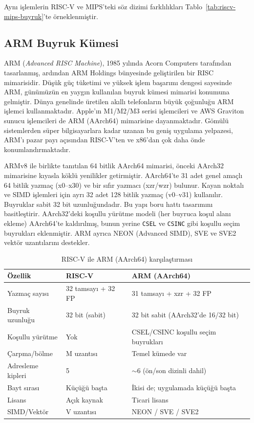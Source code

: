 Aynı işlemlerin RISC-V ve MIPS'teki söz dizimi farklılıkları Tablo~\ref{tab:riscv-mips-buyruk}'te örneklenmiştir.

\subsection{ARM Buyruk Kümesi}

ARM (\textit{Advanced RISC Machine}), 1985 yılında Acorn Computers tarafından tasarlanmış, ardından ARM Holdings bünyesinde geliştirilen bir RISC mimarisidir. Düşük güç tüketimi ve yüksek işlem başarımı dengesi sayesinde ARM, günümüzün en yaygın kullanılan buyruk kümesi mimarisi konumuna gelmiştir. Dünya genelinde üretilen akıllı telefonların büyük çoğunluğu ARM işlemci kullanmaktadır. Apple'ın M1/M2/M3 serisi işlemcileri ve AWS Graviton sunucu işlemcileri de ARM (AArch64) mimarisine dayanmaktadır. Gömülü sistemlerden süper bilgisayarlara kadar uzanan bu geniş uygulama yelpazesi, ARM'ı pazar payı açısından RISC-V'ten ve x86'dan çok daha önde konumlandırmaktadır.

ARMv8 ile birlikte tanıtılan 64 bitlik AArch64 mimarisi, önceki AArch32 mimarisine kıyasla köklü yenilikler getirmiştir. AArch64'te 31 adet genel amaçlı 64 bitlik yazmaç (x0--x30) ve bir sıfır yazmacı (xzr/wzr) bulunur. Kayan noktalı ve SIMD işlemleri için ayrı 32 adet 128 bitlik yazmaç (v0--v31) kullanılır. Buyruklar sabit 32 bit uzunluğundadır. Bu yapı boru hattı tasarımını basitleştirir. AArch32'deki koşullu yürütme modeli (her buyruca koşul alanı ekleme) AArch64'te kaldırılmış, bunun yerine \texttt{CSEL} ve \texttt{CSINC} gibi koşullu seçim buyrukları eklenmiştir. ARM ayrıca NEON (Advanced SIMD), SVE ve SVE2 vektör uzantılarını destekler.

\begin{table}[H]
\centering
\caption{RISC-V ile ARM (AArch64) karşılaştırması}
\label{tab:riscv-arm-karsilastirma}
\small
\begin{tabular}{lll}
\toprule
\textbf{Özellik} & \textbf{RISC-V} & \textbf{ARM (AArch64)} \\
\midrule
Yazmaç sayısı        & 32 tamsayı + 32 FP      & 31 tamsayı + xzr + 32 FP \\
Buyruk uzunluğu      & 32 bit (sabit)          & 32 bit sabit (AArch32'de 16/32 bit) \\
Koşullu yürütme      & Yok                     & CSEL/CSINC koşullu seçim buyrukları \\
Çarpma/bölme         & M uzantısı              & Temel kümede var \\
Adresleme kipleri    & 5                       & $\sim$6 (ön/son dizinli dahil) \\
Bayt sırası          & Küçüğü başta            & İkisi de; uygulamada küçüğü başta \\
Lisans               & Açık kaynak             & Ticari lisans \\
SIMD/Vektör          & V uzantısı              & NEON / SVE / SVE2 \\
\bottomrule
\end{tabular}
\end{table}

